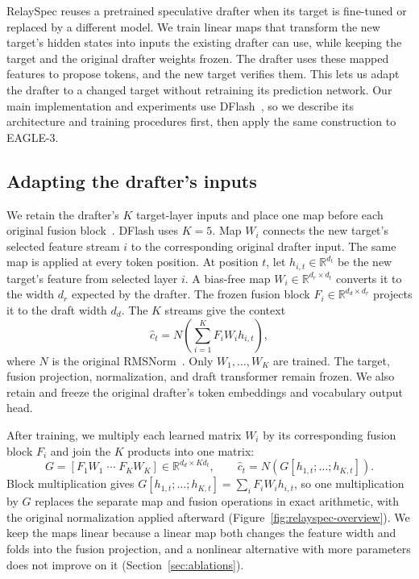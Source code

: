 RelaySpec reuses a pretrained speculative drafter when its target is fine-tuned or replaced by a different model. We train linear maps that transform the new target's hidden states into inputs the existing drafter can use, while keeping the target and the original drafter weights frozen. The drafter uses these mapped features to propose tokens, and the new target verifies them. This lets us adapt the drafter to a changed target without retraining its prediction network. Our main implementation and experiments use DFlash~\citep{chen2026dflash}, so we describe its architecture and training procedures first, then apply the same construction to EAGLE-3.

\subsection{Adapting the drafter's inputs}
\label{sec:method-inputs}
We retain the drafter's $K$ target-layer inputs and place one map before each original fusion block~\citep{chen2026dflash}. DFlash uses $K=5$. Map $W_i$ connects the new target's selected feature stream $i$ to the corresponding original drafter input. The same map is applied at every token position. At position $t$, let $h_{i,t}\in\mathbb R^{d_t}$ be the new target's feature from selected layer $i$. A bias-free map $W_i\in\mathbb R^{d_r\times d_t}$ converts it to the width $d_r$ expected by the drafter. The frozen fusion block $F_i\in\mathbb R^{d_d\times d_r}$ projects it to the draft width $d_d$. The $K$ streams give the context
\begin{equation}
 \widehat c_t=N\!\left(\sum_{i=1}^{K}F_i W_i h_{i,t}\right),
 \label{eq:mapped-context}
\end{equation}
where $N$ is the original RMSNorm~\citep{zhang2019rmsnorm}. Only $W_1,\ldots,W_K$ are trained. The target, fusion projection, normalization, and draft transformer remain frozen. We also retain and freeze the original drafter's token embeddings and vocabulary output head.

After training, we multiply each learned matrix $W_i$ by its corresponding fusion block $F_i$ and join the $K$ products into one matrix:
\begin{equation}
 G=[F_1W_1\;\cdots\;F_KW_K]\in\mathbb R^{d_d\times Kd_t},
 \qquad \widehat c_t=N(G[h_{1,t};\ldots;h_{K,t}]).
 \label{eq:folded-fusion}
\end{equation}
Block multiplication gives $G[h_{1,t};\ldots;h_{K,t}]=\sum_i F_iW_ih_{i,t}$, so one multiplication by $G$ replaces the separate map and fusion operations in exact arithmetic, with the original normalization applied afterward (Figure~\ref{fig:relayspec-overview}). We keep the maps linear because a linear map both changes the feature width and folds into the fusion projection, and a nonlinear alternative with more parameters does not improve on it (Section~\ref{sec:ablations}).

